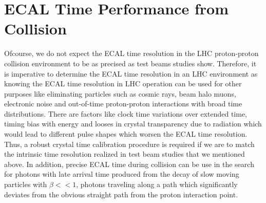 \section{ECAL Time Performance from Collision}
Ofcourse, we do not expect the ECAL time resolution in the LHC proton-proton collision environment to be as precised as test beams studies show. Therefore, it is imperative to determine the ECAL time resolution in an LHC environment as knowing the ECAL time resolution in LHC operation can be used for other purposes like eliminating particles such as cosmic rays, beam halo muons, electronic noise and out-of-time proton-proton interactions with broad time distributions. There are factors like clock time variations over extended time, timing bias with energy and looses in crystal transparency due to radiation which would lead to different pulse shapes which worsen the ECAL time resolution. Thus, a robust crystal time calibration procedure is required if we are to match the intrinsic time resolution realized in test beam studies that we mentioned above. In addition, precise ECAL time during collision can be use in the search for photons with late arrival time produced from the decay of slow moving particles with $\beta << 1$, photons traveling along a path which significantly deviates from the obvious straight path from the proton interaction point.%
